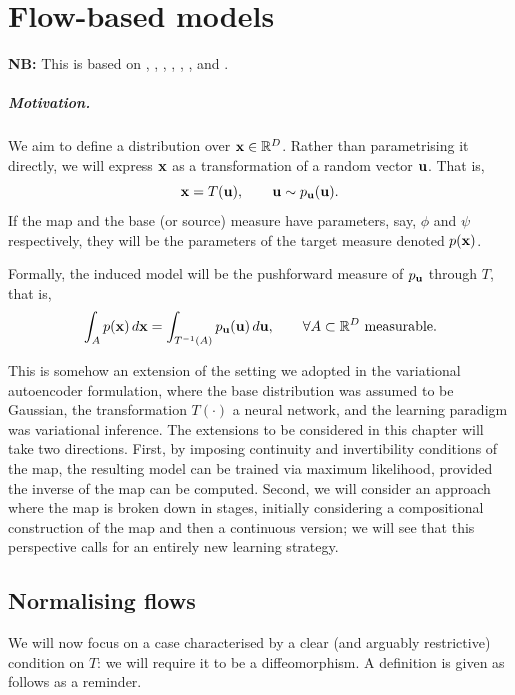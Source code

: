 \chapter{Flow-based models}

\textbf{NB:} This is based on \cite{papamakarios2021normalizing}, \cite{lipman2023flowmatching}, \cite{lipman2024flowmatchingtutorial}, \cite{grathwohl2019ffjord},  \cite{tong2023improving},  \cite{chen2018neuralode}, and \cite{liu2022rectified}.


\paragraph{Motivation.}

We aim to define a distribution over ${ \mathbf{x}}\in{\mathbb R}^D$. Rather than parametrising it directly, we will express ${ \mathbf{x}}$ as a transformation of a random vector ${ \mathbf{u}}$. That is,
\[{ \mathbf{x}} = T({ \mathbf{u}}), \qquad { \mathbf{u}} \sim p_{ \mathbf{u}}({ \mathbf{u}}).\] If the map and the base (or source) measure have parameters, say, $\phi$ and $\psi$ respectively, they will be the parameters of the target measure denoted $p({ \mathbf{x}})$.

Formally, the induced model will be the pushforward measure of $p_{ \mathbf{u}}$ through $T$, that is,
\begin{equation}
    \label{eq:push_forward_density}
    \int_A p({ \mathbf{x}})\, d{ \mathbf{x}}
=
\int_{T^{-1}(A)} p_{ \mathbf{u}}({ \mathbf{u}})\, d{ \mathbf{u}} ,
\qquad
\forall A \subset \mathbb{R}^D \text{ measurable}.    
\end{equation}


This is somehow an extension of the setting we adopted in the variational autoencoder formulation, where the base distribution was assumed to be Gaussian, the transformation $T(\cdot)$ a neural network, and the learning paradigm was variational inference. The extensions to be considered in this chapter will take two directions. First, by imposing continuity and invertibility conditions of the map, the resulting model can be trained via maximum likelihood, provided the inverse of the map can be computed. Second, we will consider an approach where the map is broken down in stages, initially considering a compositional construction of the map and then a continuous version; we will see that this perspective calls for an entirely new learning strategy. 


\section{Normalising flows}

We will now focus on a case characterised by a clear (and arguably restrictive) condition on $T$: we will require it to be a diffeomorphism. A definition is given as follows as a reminder.

